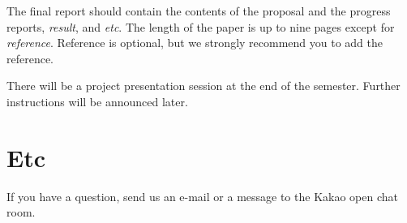 \documentclass[final]{cvpr}
\begin{document}
The final report should contain the contents of the proposal and the progress reports, \textit{result}, and \textit{etc}. The length of the paper is up to nine pages except for \textit{reference}. Reference is optional, but we strongly recommend you to add the reference.

There will be a project presentation session at the end of the semester. Further instructions will be announced later.

\section{Etc}

If you have a question, send us an e-mail or a message to the Kakao open chat room.

{\small


}
\end{document}

